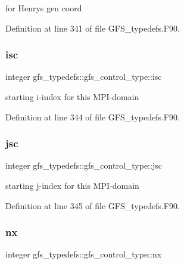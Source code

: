 for Henry\textquotesingle{}s gen coord 



Definition at line 341 of file G\+F\+S\+\_\+typedefs.\+F90.

\mbox{\label{structgfs__typedefs_1_1gfs__control__type_ab2d6058146b0e2985845e6a37392d422}} 
\subsubsection{isc}
{\footnotesize\ttfamily integer gfs\+\_\+typedefs\+::gfs\+\_\+control\+\_\+type\+::isc}



starting i-\/index for this M\+P\+I-\/domain 



Definition at line 344 of file G\+F\+S\+\_\+typedefs.\+F90.

\mbox{\label{structgfs__typedefs_1_1gfs__control__type_a17efd060f9cdf5b4801fafd3aeb3e205}} 
\subsubsection{jsc}
{\footnotesize\ttfamily integer gfs\+\_\+typedefs\+::gfs\+\_\+control\+\_\+type\+::jsc}



starting j-\/index for this M\+P\+I-\/domain 



Definition at line 345 of file G\+F\+S\+\_\+typedefs.\+F90.

\mbox{\label{structgfs__typedefs_1_1gfs__control__type_a833cb3b48b9af12ef17002afa81f9b5d}} 
\subsubsection{nx}
{\footnotesize\ttfamily integer gfs\+\_\+typedefs\+::gfs\+\_\+control\+\_\+type\+::nx}



